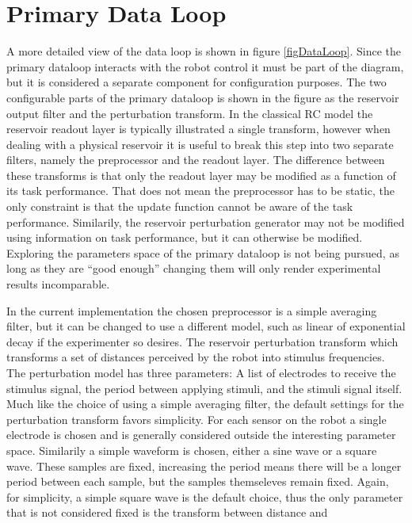 \section{Primary Data Loop}
A more detailed view of the data loop is shown in figure \ref{figDataLoop}.
Since the primary dataloop interacts with the robot control it must be part of
the diagram, but it is considered a separate component for configuration
purposes.
The two configurable parts of the primary dataloop is shown in the figure as the
reservoir output filter and the perturbation transform.
In the classical RC model the reservoir readout layer is typically illustrated a single
transform, however when 
dealing with a physical reservoir it is useful to break this step into two
separate filters, namely the preprocessor and the readout layer.
The difference between these transforms is that only the readout layer may be
modified as a function of its task performance.
That does not mean the preprocessor has to be static, the only constraint is
that the update function cannot be aware of the task performance.
Similarily, the reservoir perturbation generator may not be modified using
information on task performance, but it can otherwise be modified.
Exploring the parameters space of the primary dataloop is not being pursued, as
long as they are ``good enough'' changing them will only render experimental
results incomparable.
\par
In the current implementation the chosen preprocessor is a simple averaging
filter, but it can be changed to use a different model, such as linear of
exponential decay if the experimenter so desires.
The reservoir perturbation transform which transforms a
set of distances perceived by the robot into stimulus frequencies.
The perturbation model has three parameters: A list of electrodes to receive the
stimulus signal, the period between applying stimuli, and the stimuli signal
itself.
Much like the choice of using a simple averaging filter, the default settings
for the perturbation transform favors simplicity.
For each sensor on the robot a single electrode is chosen and is generally
considered outside the interesting parameter space.
Similarily a simple waveform is chosen, either a sine wave or a square wave.
These samples are fixed, increasing the period means there will be a longer
period between each sample, but the samples themseleves remain fixed.
Again, for simplicity, a simple square wave is the default choice, thus the only
parameter that is not considered fixed is the transform between distance and

